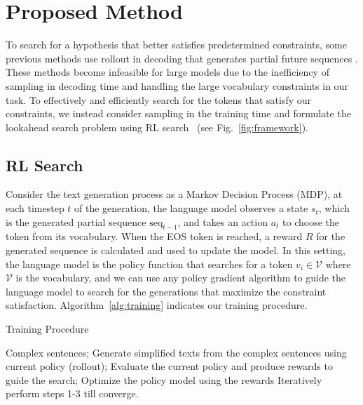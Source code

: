 \section{Proposed Method}
To search for a hypothesis that better satisfies predetermined constraints, some previous methods use rollout in decoding that generates partial future sequences \cite{chaffin-etal-2022-ppl, lu-etal-2022-neurologic}. 
These methods become infeasible for large models due to the inefficiency of sampling in decoding time and handling the large vocabulary constraints in our task. %
To effectively and efficiently search for the tokens that satisfy our constraints, we instead consider sampling in the training time and formulate the lookahead search problem using RL search~\cite{fickinger2021scalable} (see Fig.~\ref{fig:framework}). 

\subsection{RL Search}
Consider the text generation process as a Markov Decision Process (MDP), at each timestep $t$ of the generation, the language model observes a state $s_t$, which is the generated partial sequence $ \text{seq}_{t-1}$, and takes an action $a_t$ to choose the token from its vocabulary. When the EOS token is reached, a reward $R$ for the generated sequence is calculated and used to update the model. %
In this setting, the language model is the policy function that 
searches for a token $v_i \in \mathcal{V}$ where $\mathcal{V}$ is the vocabulary,
and we can use any policy gradient algorithm to guide the language model to search for the generations that maximize the constraint satisfaction. 
Algorithm~\ref{alg:training} indicates our training procedure. 
\begin{algorithm}[t!]
\caption{Training Procedure}
\label{alg:training}
\begin{algorithmic}[1]
    \Require Complex sentences;
    \State Generate simplified texts from the complex sentences using current policy (rollout);
     \State Evaluate the current policy and produce rewards to guide the search;
    \State Optimize the policy model using the rewards
    \State Iteratively perform steps 1-3 till converge.
\end{algorithmic}
\end{algorithm}


